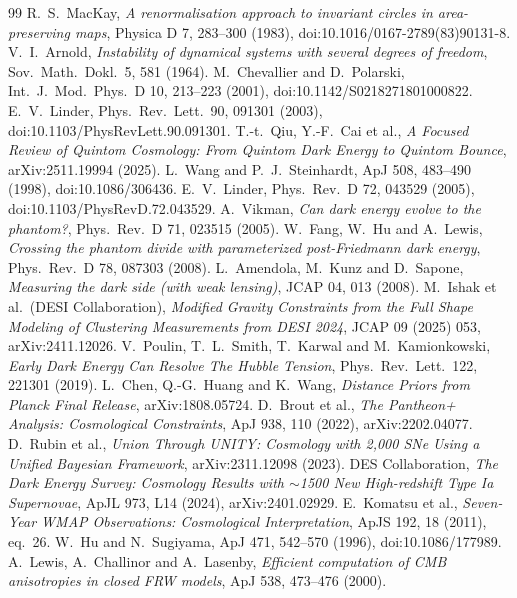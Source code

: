 \documentclass[11pt]{article}
\theoremstyle{definition}
\theoremstyle{remark}
\begin{document}
\begin{thebibliography}{99}
 R.~S.~MacKay, \emph{A renormalisation approach to invariant circles in area-preserving maps}, Physica D 7, 283--300 (1983), doi:10.1016/0167-2789(83)90131-8.
 V.~I.~Arnold, \emph{Instability of dynamical systems with several degrees of freedom}, Sov.\ Math.\ Dokl.\ 5, 581 (1964).
 M.~Chevallier and D.~Polarski, Int.\ J.\ Mod.\ Phys.\ D 10, 213--223 (2001), doi:10.1142/S0218271801000822.
 E.~V.~Linder, Phys.\ Rev.\ Lett.\ 90, 091301 (2003), doi:10.1103/PhysRevLett.90.091301.
 T.-t.~Qiu, Y.-F.~Cai et al., \emph{A Focused Review of Quintom Cosmology: From Quintom Dark Energy to Quintom Bounce}, arXiv:2511.19994 (2025).
 L.~Wang and P.~J.~Steinhardt, ApJ 508, 483--490 (1998), doi:10.1086/306436.
 E.~V.~Linder, Phys.\ Rev.\ D 72, 043529 (2005), doi:10.1103/PhysRevD.72.043529.
 A.~Vikman, \emph{Can dark energy evolve to the phantom?}, Phys.\ Rev.\ D 71, 023515 (2005).
 W.~Fang, W.~Hu and A.~Lewis, \emph{Crossing the phantom divide with parameterized post-Friedmann dark energy}, Phys.\ Rev.\ D 78, 087303 (2008).
 L.~Amendola, M.~Kunz and D.~Sapone, \emph{Measuring the dark side (with weak lensing)}, JCAP 04, 013 (2008).
 M.~Ishak et al.\ (DESI Collaboration), \emph{Modified Gravity Constraints from the Full Shape Modeling of Clustering Measurements from DESI 2024}, JCAP 09 (2025) 053, arXiv:2411.12026.
 V.~Poulin, T.~L.~Smith, T.~Karwal and M.~Kamionkowski, \emph{Early Dark Energy Can Resolve The Hubble Tension}, Phys.\ Rev.\ Lett.\ 122, 221301 (2019).
 L.~Chen, Q.-G.~Huang and K.~Wang, \emph{Distance Priors from Planck Final Release}, arXiv:1808.05724.
 D.~Brout et al., \emph{The Pantheon+ Analysis: Cosmological Constraints}, ApJ 938, 110 (2022), arXiv:2202.04077.
 D.~Rubin et al., \emph{Union Through UNITY: Cosmology with 2,000 SNe Using a Unified Bayesian Framework}, arXiv:2311.12098 (2023).
 DES Collaboration, \emph{The Dark Energy Survey: Cosmology Results with $\sim$1500 New High-redshift Type Ia Supernovae}, ApJL 973, L14 (2024), arXiv:2401.02929.
 E.~Komatsu et al., \emph{Seven-Year WMAP Observations: Cosmological Interpretation}, ApJS 192, 18 (2011), eq.~26.
 W.~Hu and N.~Sugiyama, ApJ 471, 542--570 (1996), doi:10.1086/177989.
 A.~Lewis, A.~Challinor and A.~Lasenby, \emph{Efficient computation of CMB anisotropies in closed FRW models}, ApJ 538, 473--476 (2000).

\end{thebibliography}
\end{document}
